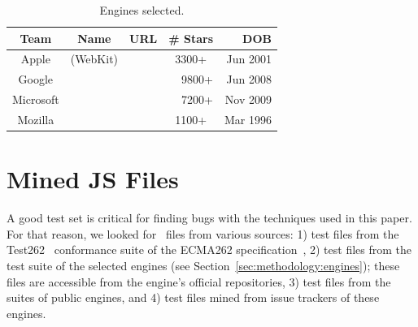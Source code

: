 \documentclass[sigconf,review, anonymous]{acmart}
\begin{document}
\begin{table}[t]
  \small
  \centering
  \caption{\label{tab:engines}Engines selected.}
  \begin{tabular}{cccrr}
    \toprule
    Team & Name & URL & \# Stars  & DOB \\
    \midrule
    Apple & \jsc{} (WebKit) & \cite{jsc2018repo} &
    \multicolumn{1}{c}{3300+} & Jun 2001\\
    Google & \veight{} & \cite{v82018repo} & 9800+ & Jun 2008\\
    Microsoft & \chakra{} & \cite{chakra2018repo} & 7200+ & Nov 2009\\
    Mozilla & \smonkey{} & \cite{spidermonkey2018repo} &
    \multicolumn{1}{c}{1100+} & Mar 1996\\
   \bottomrule     
  \end{tabular}
\end{table}

\section{Mined JS Files}
\label{sec:seeds}
A good test set is critical for finding bugs with the techniques used
in this paper. For that reason, we looked for \js\ files from various
sources: 1) test files from the Test262~\cite{tc39-github} conformance
suite of the ECMA262 specification~\cite{ecmas262-spec}, 2) test files
from the test suite of the selected engines (see
Section~\ref{sec:methodology:engines}); these files are accessible
from the engine's official repositories, 3) test files from the suites
of public engines, and 4) test files mined from issue trackers of
these engines.

\end{document}
